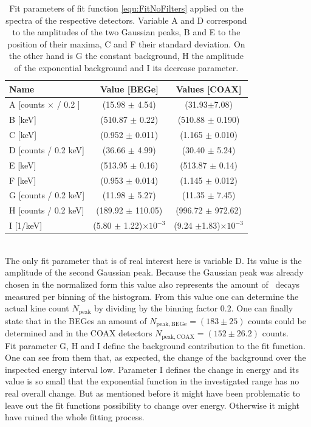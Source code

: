 \documentclass[encoding=utf8,british]{tumphthesis}
\begin{document}
\begin{table}[t!]
\centering
\begin{tabular}{|l|c|c|}
\hline
Name	& Value [BEGe] & Values [COAX]\\ 
\hline
A [counts $\times$ / 0.2 ] &	(15.98 \(\pm\)	4.54)&	(31.93\(\pm\)7.08)	\\	
\hline
B [keV] &	(510.87 \(\pm\)	0.22)&	(510.88 \(\pm\)	0.190)\\	
\hline
C [keV] &	(0.952 \(\pm\)	0.011)	&	(1.165 \(\pm\)	0.010)	\\
\hline
D [counts / 0.2 keV] &	(36.66 \(\pm\)	4.99)	&	(30.40 \(\pm\)	5.24)	\\
\hline
E [keV] &	(513.95 \(\pm\)	0.16)	&	(513.87 \(\pm\)	0.14)	\\
\hline
F [keV] &	(0.953 \(\pm\)	0.014)	&	(1.145 \(\pm\)	0.012)	\\
\hline
G [counts / 0.2 keV] &	(11.98 \(\pm\)	5.27)	&	(11.35 \(\pm\)	7.45)	\\
\hline
H [counts / 0.2 keV] &	(189.92 \(\pm\)	110.05)	&	(996.72 \(\pm\)	972.62)	\\
\hline
I [1/keV] &	(5.80 \(\pm\) 1.22)$\times10^{-3}$	&	(9.24 \(\pm\)1.83)$\times10^{-3}$ \\
\hline

\end{tabular}
\caption{
	Fit parameters of fit function \ref{equ:FitNoFilters} applied on the spectra of the respective detectors. 
	Variable A and D correspond to the amplitudes of the two Gaussian peaks, B and E to the position of their maxima, C and F their standard deviation. 
	On the other hand is G the constant background, H the amplitude of the exponential background and I its decrease parameter.
	}
\label{tab:FitParNoFilter}
\end{table}
\\

The only fit parameter that is of real interest here is variable D.
Its value is the amplitude of the second Gaussian peak.
Because the Gaussian peak was already chosen in the normalized form this value also represents the amount of \Kr\ decays measured per binning of the histogram.
From this value one can determine the actual kine count $N_{\mathrm{peak}}$ by dividing by the binning factor $0.2$.
One can finally state that in the BEGes an amount of $N_{\mathrm{peak,BEGe}} = (183\pm25)$ counts could be determined and in the COAX detectors $N_{\mathrm{peak,COAX}} = (152\pm26.2)$ counts.
\\


Fit parameter G, H and I define the background contribution to the fit function.
One can see from them that, as expected, the change of the background over the inspected energy interval low.
Parameter I defines the change in energy and its value is so small that the exponential function in the investigated range has no real overall change.
But as mentioned before it might have been problematic to leave out the fit functions possibility to change over energy.
Otherwise it might have ruined the whole fitting process. 
\\
\end{document}
